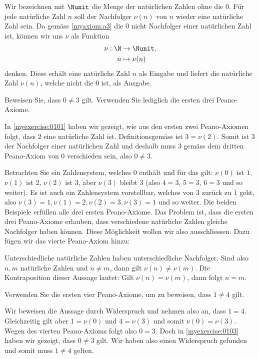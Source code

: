 \begin{myremark}\label{myremark:Nunit}
	Wir bezeichnen mit $\Nunit$ die Menge der natürlichen Zahlen ohne die $0$.
	Für jede natürliche Zahl $n$ soll der Nachfolger $\nu(n)$ von $n$ wieder eine natürliche Zahl sein.
	Da gemäss \cref{myaxiom:a3} die $0$ nicht Nachfolger einer natürlichen Zahl ist, können wir uns $\nu$ als Funktion
	\begin{align*}
		\nu: \N & \to\Nunit,     \\
		n       & \mapsto \nu(n)
	\end{align*}
	denken. Diese erhält eine natürliche Zahl $n$ als Eingabe und liefert die natürliche Zahl $\nu(n)$, welche nicht die $0$ ist, als Ausgabe.
\end{myremark}
\begin{myexercise}\label{myexercise:0103}
	Beweisen Sie, dass $0\neq 3$ gilt. Verwenden Sie lediglich die ersten drei Peano-Axiome.
	\begin{myanswer}
		In \cref{myexercise:0101} haben wir gezeigt, wie aus den ersten zwei Peano-Axiomen folgt, dass $2$ eine natürliche Zahl ist.
		Definitionsgemäss ist $3=\nu(2)$.
		Somit ist $3$ der Nachfolger einer natürlichen Zahl und deshalb muss $3$ gemäss dem dritten Peano-Axiom von $0$ verschieden sein, also $0\neq 3$.
	\end{myanswer}
\end{myexercise}
\noindent
Betrachten Sie ein Zahlensystem, welches $0$ enthält und für das gilt: $\nu(0)$ ist $1$, $\nu(1)$ ist 2, $\nu(2)$ ist $3$, aber $\nu(3)$ bleibt $3$ (also $4=3$, $5=3$, $6=3$ und so weiter). Es ist auch ein Zahlensystem vorstellbar, welches von $3$ zurück zu $1$ geht, also $\nu(3)=1, \nu(1)=2, \nu(2)=3, \nu(3)=1$ und so weiter. Die beiden Beispiele erfüllen alle drei ersten Peano-Axiome. Das Problem ist, dass die ersten drei Peano-Axiome erlauben, dass verschiedene natürliche Zahlen gleiche Nachfolger haben können. Diese Möglichkeit wollen wir also ausschliessen. Dazu fügen wir das vierte Peano-Axiom hinzu:
\begin{myaxiom}\label{myaxiom:a4}
	Unterschiedliche natürliche Zahlen haben unterschiedliche Nachfolger.
	Sind also $n,m$ natürliche Zahlen und $n\neq m$, dann gilt $\nu(n)\neq\nu(m)$.
	Die Kontraposition dieser Aussage lautet: Gilt $\nu(n)=\nu(m)$, dann folgt $n=m$.
\end{myaxiom}
\begin{myexercise}\label{myexercise:0104}
	Verwenden Sie die ersten vier Peano-Axiome, um zu beweisen, dass $1\neq 4$ gilt.
	\begin{myanswer}
		Wir beweisen die Aussage durch Widerspruch und nehmen also an, dass $1=4$.
		Gleichzeitig gilt aber $1=\nu(0)$ und $4=\nu(3)$ und somit $\nu(0)=\nu(3)$.
		Wegen des vierten Peano-Axioms folgt also $0=3$.
		Doch in \cref{myexercise:0103} haben wir gezeigt, dass $0\neq 3$ gilt.
		Wir haben also einen Widerspruch gefunden und somit muss $1\neq 4$ gelten.
	\end{myanswer}
\end{myexercise}

